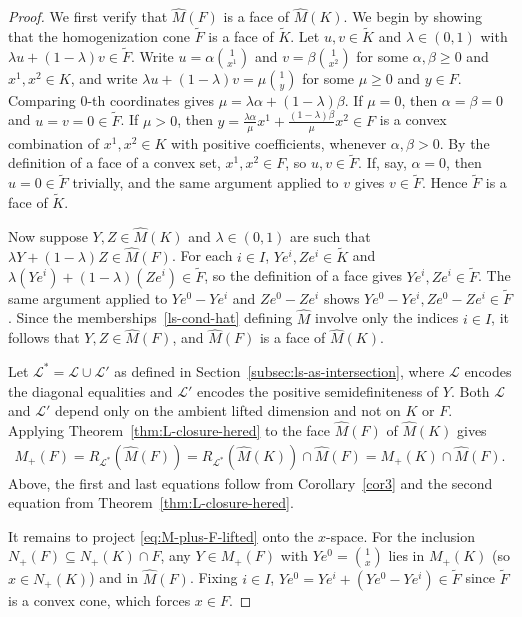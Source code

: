 \documentclass{article}
\renewcommand{\L}{\mathcal{L}}
\begin{document}
\begin{proof}
    We first verify that $\hat M(F)$ is a face of $\hat M(K)$. We begin by showing that the homogenization cone $\tilde F$ is a face of $\tilde K$. Let $u, v \in \tilde K$ and $\lambda \in (0,1)$ with $\lambda u + (1-\lambda) v \in \tilde F$. Write $u = \alpha \binom{1}{x^1}$ and $v = \beta \binom{1}{x^2}$ for some $\alpha,\beta \geq 0$ and $x^1, x^2 \in K$, and write $\lambda u + (1-\lambda) v = \mu \binom{1}{y}$ for some $\mu \geq 0$ and $y \in F$. Comparing $0$-th coordinates gives $\mu = \lambda \alpha + (1-\lambda)\beta$. If $\mu = 0$, then $\alpha = \beta = 0$ and $u = v = 0 \in \tilde F$. If $\mu > 0$, then $y = \frac{\lambda \alpha}{\mu} x^1 + \frac{(1-\lambda)\beta}{\mu} x^2 \in F$ is a convex combination of $x^1, x^2 \in K$ with positive coefficients, whenever $\alpha,\beta > 0$. By the definition of a face of a convex set, $x^1, x^2 \in F$, so $u, v \in \tilde F$. If, say, $\alpha = 0$, then $u = 0 \in \tilde F$ trivially, and the same argument applied to $v$ gives $v \in \tilde F$. Hence $\tilde F$ is a face of $\tilde K$.

    Now suppose $Y, Z \in \hat M(K)$ and $\lambda \in (0,1)$ are such that $\lambda Y + (1-\lambda) Z \in \hat M(F)$. For each $i \in I$, $Ye^i, Ze^i \in \tilde K$ and $\lambda(Ye^i) + (1-\lambda)(Ze^i) \in \tilde F$, so the definition of a face gives $Ye^i, Ze^i \in \tilde F$. The same argument applied to $Ye^0 - Ye^i$ and $Ze^0 - Ze^i$ shows $Ye^0 - Ye^i, Ze^0 - Ze^i \in \tilde F$. Since the memberships~\eqref{ls-cond-hat} defining $\hat M$ involve only the indices $i \in I$, it follows that $Y, Z \in \hat M(F)$, and $\hat M(F)$ is a face of $\hat M(K)$.

    Let $\L^* = \L \cup \L'$ as defined in Section~\ref{subsec:ls-as-intersection}, where $\L$ encodes the diagonal equalities and $\L'$ encodes the positive semidefiniteness of $Y$. Both $\L$ and $\L'$ depend only on the ambient lifted dimension and not on $K$ or $F$. Applying Theorem~\ref{thm:L-closure-hered} to the face $\hat M(F)$ of $\hat M(K)$ gives
    \begin{align}
        M_+(F) = R_{\L^*}(\hat M(F)) = R_{\L^*}(\hat M(K)) \cap \hat M(F) = M_+(K) \cap \hat M(F). \label{eq:M-plus-F-lifted}
    \end{align}
    Above, the first and last equations follow from Corollary~\ref{cor3} and the second equation from Theorem~\ref{thm:L-closure-hered}.

    It remains to project \eqref{eq:M-plus-F-lifted} onto the $x$-space. For the inclusion $N_+(F) \subseteq N_+(K) \cap F$, any $Y \in M_+(F)$ with $Ye^0 = \binom{1}{x}$ lies in $M_+(K)$ (so $x \in N_+(K)$) and in $\hat M(F)$. Fixing $i \in I$, $Ye^0 = Ye^i + (Ye^0 - Ye^i) \in \tilde F$ since $\tilde F$ is a convex cone, which forces $x \in F$. 
    

\end{proof}
\end{document}
